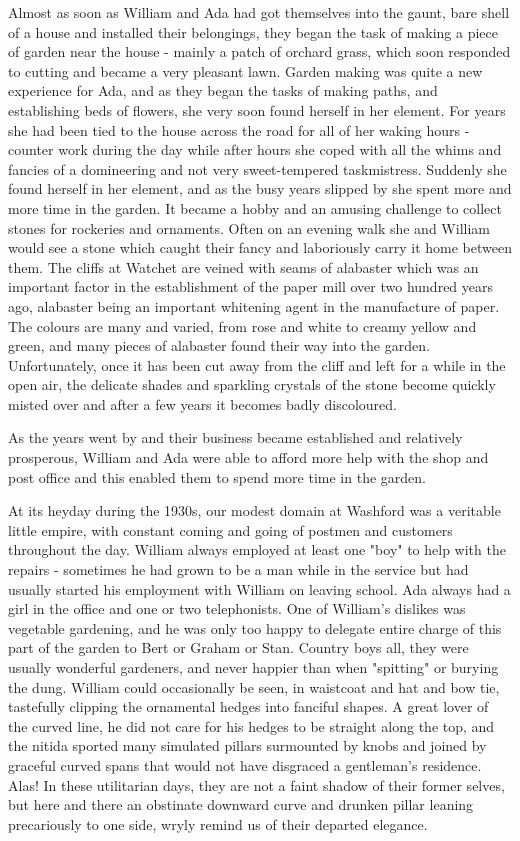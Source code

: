 
Almost as soon as William and Ada had got themselves into the gaunt, bare shell of a house and installed their belongings, they began the task of making a piece of garden near the house - mainly a patch of orchard grass, which soon responded to cutting and became a very pleasant lawn. Garden making was quite a new experience for Ada, and as they began the tasks of making paths, and establishing beds of flowers, she very soon found herself in her element. For years she had been tied to the house across the road for all of her waking hours - counter work during the day while after hours she coped with all the whims and fancies of a domineering and not very sweet-tempered taskmistress. Suddenly she found herself in her element, and as the busy years slipped by she spent more and more time in the garden. It became a hobby and an amusing challenge to collect stones for rockeries and ornaments. Often on an evening walk she and William would see a stone which caught their fancy and laboriously carry it home between them. The cliffs at Watchet are veined with seams of alabaster which was an important factor in the establishment of the paper mill over two hundred years ago, alabaster being an important whitening agent in the manufacture of paper. The colours are many and varied, from rose and white to creamy yellow and green, and many pieces of alabaster found their way into the garden. Unfortunately, once it has been cut away from the cliff and left for a while in the open air, the delicate shades and sparkling crystals of the stone become quickly misted over and after a few years it becomes badly discoloured.

As the years went by and their business became established and relatively prosperous, William and Ada were able to afford more help with the shop and post office and this enabled them to spend more time in the garden.

At its heyday during the 1930s, our modest domain at Washford was a veritable little empire, with constant coming and going of postmen and customers throughout the day. William always employed at least one "boy" to help with the repairs - sometimes he had grown to be a man while in the service but had usually started his employment with William on leaving school. Ada always had a girl in the office and one or two telephonists. One of William's dislikes was vegetable gardening, and he was only too happy to delegate entire charge of this part of the garden to Bert or Graham or Stan. Country boys all, they were usually wonderful gardeners, and never happier than when "spitting" or burying the dung. William could occasionally be seen, in waistcoat and hat and bow tie, tastefully clipping the ornamental hedges into fanciful shapes. A great lover of the curved line, he did not care for his hedges to be straight along the top, and the nitida sported many simulated pillars surmounted by knobs and joined by graceful curved spans that would not have disgraced a gentleman's residence. Alas! In these utilitarian days, they are not a faint shadow of their former selves, but here and there an obstinate downward curve and drunken pillar leaning precariously to one side, wryly remind us of their departed elegance.

